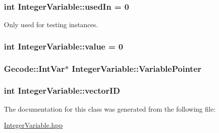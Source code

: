 \hypertarget{class_integer_variable_aa1c0490d21bfb3c86042af9407e1b369}{
\subsubsection[{used\-In}]{\setlength{\rightskip}{0pt plus 5cm}int Integer\-Variable\-::used\-In = 0}}\label{class_integer_variable_aa1c0490d21bfb3c86042af9407e1b369}


Only used for testing instances. 

\hypertarget{class_integer_variable_afbdeafc29f2cde02d187f37dc9787e7e}{
\subsubsection[{value}]{\setlength{\rightskip}{0pt plus 5cm}int Integer\-Variable\-::value = 0\hspace{0.3cm}{\ttfamily [protected]}}}\label{class_integer_variable_afbdeafc29f2cde02d187f37dc9787e7e}
\hypertarget{class_integer_variable_ac8d0d023d1051a0f046bed10c072b993}{
\subsubsection[{Variable\-Pointer}]{\setlength{\rightskip}{0pt plus 5cm}Gecode\-::\-Int\-Var$\ast$ Integer\-Variable\-::\-Variable\-Pointer\hspace{0.3cm}{\ttfamily [protected]}}}\label{class_integer_variable_ac8d0d023d1051a0f046bed10c072b993}
\hypertarget{class_integer_variable_ae81f86d5b1436c30b535e17b8b0101ed}{
\subsubsection[{vector\-I\-D}]{\setlength{\rightskip}{0pt plus 5cm}int Integer\-Variable\-::vector\-I\-D\hspace{0.3cm}{\ttfamily [protected]}}}\label{class_integer_variable_ae81f86d5b1436c30b535e17b8b0101ed}


The documentation for this class was generated from the following file\-:\begin{DoxyCompactItemize}
\item 
\hyperlink{_integer_variable_8hpp}{Integer\-Variable.\-hpp}\end{DoxyCompactItemize}
